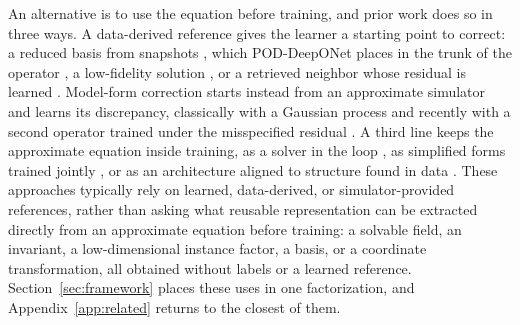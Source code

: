 \documentclass{article}
\begin{document}
An alternative is to use the equation before training, and prior work does so in three ways. A data-derived reference gives the learner a starting point to correct: a reduced basis from snapshots \citep{sirovich1987turbulence,barrault2004eim,chaturantabut2010nonlinear}, which POD-DeepONet places in the trunk of the operator \citep{lu2022}, a low-fidelity solution \citep{meng2020multifidelity}, or a retrieved neighbor whose residual is learned \citep{yue2025deltaphi}. Model-form correction starts instead from an
approximate simulator and learns its discrepancy, classically with a Gaussian process \citep{kennedy2001bayesian, brynjarsdottir2014learning} and recently with a second operator trained under the misspecified residual \citep{ma2026physics}. A third line keeps the
approximate equation inside training, as a solver in the loop \citep{um2020solver,kochkov2021machine}, as simplified forms trained jointly \citep{ma2026learning}, or as an architecture aligned to structure found in data \citep{roohi2026shock,dang2026smooth}. These approaches typically rely on learned, data-derived, or simulator-provided references, rather than asking what reusable representation can be extracted directly from an approximate equation before training: a solvable field, an invariant, a low-dimensional instance factor, a basis, or a coordinate transformation, all obtained without labels or a learned reference. Section~\ref{sec:framework} places these uses in one factorization, and Appendix~\ref{app:related} returns to the closest of them.
\end{document}
